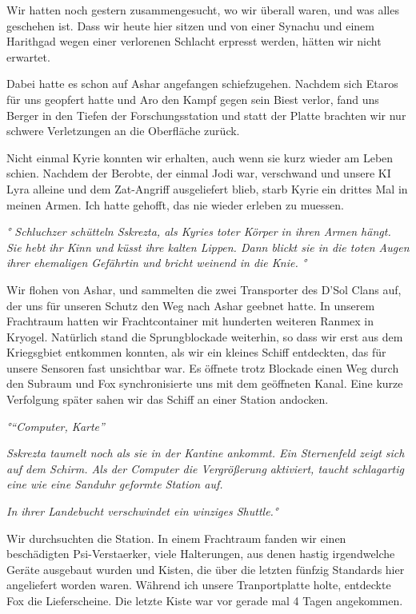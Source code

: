 \documentclass[11pt]{article}
\begin{document}
Wir hatten noch gestern zusammengesucht, wo wir überall waren, und was
alles geschehen ist. Dass wir heute hier sitzen und von einer Synachu
und einem Harithgad wegen einer verlorenen Schlacht erpresst werden,
hätten wir nicht erwartet.

Dabei hatte es schon auf Ashar angefangen schiefzugehen. Nachdem sich
Etaros für uns geopfert hatte und Aro den Kampf gegen sein Biest verlor,
fand uns Berger in den Tiefen der Forschungsstation und statt der Platte
brachten wir nur schwere Verletzungen an die Oberfläche zurück.

Nicht einmal Kyrie konnten wir erhalten, auch wenn sie kurz wieder am
Leben schien. Nachdem der Berobte, der einmal Jodi war, verschwand und
unsere KI Lyra alleine und dem Zat-Angriff ausgeliefert blieb, starb
Kyrie ein drittes Mal in meinen Armen. Ich hatte gehofft, das nie wieder
erleben zu muessen.

\emph{° Schluchzer schütteln Sskrezta, als Kyries toter Körper in ihren
Armen hängt. Sie hebt ihr Kinn und küsst ihre kalten Lippen. Dann blickt
sie in die toten Augen ihrer ehemaligen Gefährtin und bricht weinend in
die Knie. °}

Wir flohen von Ashar, und sammelten die zwei Transporter des D'Sol Clans
auf, der uns für unseren Schutz den Weg nach Ashar geebnet hatte. In
unserem Frachtraum hatten wir Frachtcontainer mit hunderten weiteren
Ranmex in Kryogel. Natürlich stand die Sprungblockade weiterhin, so dass
wir erst aus dem Kriegsgbiet entkommen konnten, als wir ein kleines
Schiff entdeckten, das für unsere Sensoren fast unsichtbar war. Es
öffnete trotz Blockade einen Weg durch den Subraum und Fox
synchronisierte uns mit dem geöffneten Kanal. Eine kurze Verfolgung
später sahen wir das Schiff an einer Station andocken.

\emph{°``Computer, Karte''}

\emph{Sskrezta taumelt noch als sie in der Kantine ankommt. Ein
Sternenfeld zeigt sich auf dem Schirm. Als der Computer die Vergrößerung
aktiviert, taucht schlagartig eine wie eine Sanduhr geformte Station
auf.}

\emph{In ihrer Landebucht verschwindet ein winziges Shuttle.°}

Wir durchsuchten die Station. In einem Frachtraum fanden wir einen
beschädigten Psi-Verstaerker, viele Halterungen, aus denen hastig
irgendwelche Geräte ausgebaut wurden und Kisten, die über die letzten
fünfzig Standards hier angeliefert worden waren. Während ich unsere
Tranportplatte holte, entdeckte Fox die Lieferscheine. Die letzte Kiste
war vor gerade mal 4 Tagen angekommen.
\end{document}
